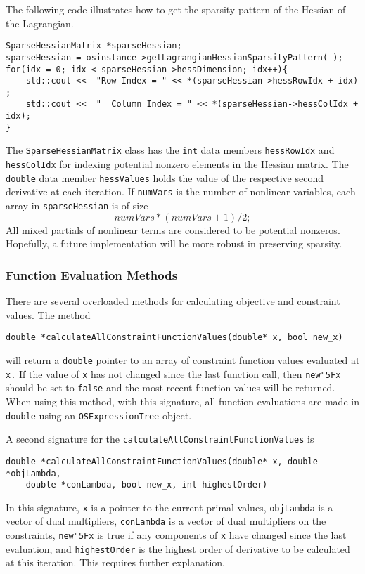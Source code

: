 \documentclass[11pt]{article}
\renewcommand{\_}{{\char"5F}}
\renewcommand{\{}{{\char"7B}}
\renewcommand{\}}{{\char"7D}}
\renewcommand{\^}{{\char"0D}}
\renewcommand{\'}{{\char"0D}}
\begin{document}
The following code illustrates how to get the sparsity pattern of the Hessian of the Lagrangian.
\begin{verbatim}
SparseHessianMatrix *sparseHessian;
sparseHessian = osinstance->getLagrangianHessianSparsityPattern( );
for(idx = 0; idx < sparseHessian->hessDimension; idx++){
	std::cout <<  "Row Index = " << *(sparseHessian->hessRowIdx + idx) ;
	std::cout <<  "  Column Index = " << *(sparseHessian->hessColIdx + idx);
}
\end{verbatim}
The {\tt SparseHessianMatrix} class has the {\tt int} data members {\tt hessRowIdx} and {\tt hessColIdx} for indexing  potential nonzero elements in the Hessian matrix. The {\tt double} data member {\tt hessValues} holds the value of the respective second derivative at each iteration.  If {\tt numVars} is the number of nonlinear variables, each array in {\tt sparseHessian} is of size 
$$
numVars*(numVars + 1)/2;
$$
All mixed partials of nonlinear terms are considered to be potential nonzeros.  Hopefully, a future implementation will be more robust in preserving sparsity. 


\subsubsection{Function Evaluation Methods}

There are several overloaded methods for calculating objective and constraint values.  The method
\begin{verbatim}
double *calculateAllConstraintFunctionValues(double* x, bool new_x)
\end{verbatim}
will return a {\tt double} pointer to an array of constraint function values evaluated at {\tt x.}  If the value of {\tt x} has not changed since the last function call, then {\tt new\_x} should be set to {\tt false} and the most recent function values will be returned.  When using this method, with this signature,  all function evaluations  are made in {\tt double} using an {\tt OSExpressionTree} object. 

A second signature for the {\tt calculateAllConstraintFunctionValues} is
\begin{verbatim}
double *calculateAllConstraintFunctionValues(double* x, double *objLambda, 
    double *conLambda, bool new_x, int highestOrder)
\end{verbatim}
In this  signature, {\tt x} is a pointer to the current primal values, {\tt objLambda} is a vector of dual multipliers, {\tt conLambda} is a vector of dual multipliers on the constraints,  {\tt new\_x} is true if any components of {\tt x} have changed since the last evaluation, and {\tt highestOrder} is the highest order of derivative to be calculated at this iteration. This requires further explanation. 
\end{document}
